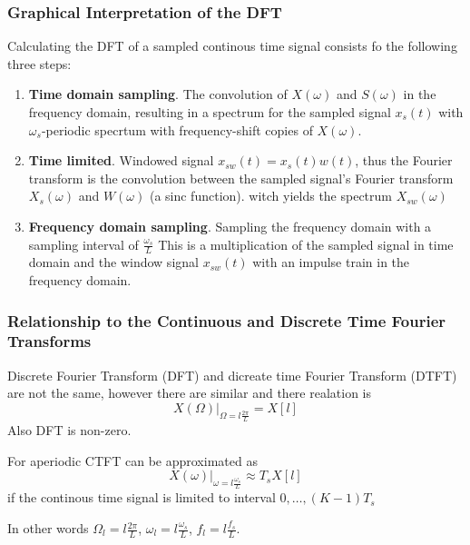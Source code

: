 \subsubsection{Graphical Interpretation of the DFT}
Calculating the DFT of a sampled continous time signal consists fo the following three steps:
\begin{enumerate}
    \item \textbf{Time domain sampling}. The convolution of $X(\omega)$ and $S(\omega)$
    in the frequency domain, resulting in a spectrum for the sampled signal $x_s(t)$ with 
    $\omega_s$-periodic specrtum with frequency-shift copies of $X(\omega)$. 
    \item \textbf{Time limited}. Windowed signal $x_{sw}(t)=x_s(t)w(t)$, thus the 
    Fourier transform is the convolution between the sampled signal's Fourier transform $X_s(\omega)$
    and $W(\omega)$ (a sinc function). witch yields the spectrum $X_{sw}(\omega)$
    \item \textbf{Frequency domain sampling}. Sampling the frequency domain with a sampling interval of $\frac{\omega_s}{L}$
    This is a multiplication of the sampled signal in time domain and the window signal $x_{sw}(t)$
    with an impulse train in the frequency domain.
\end{enumerate}


\subsubsection{Relationship to the Continuous and Discrete Time Fourier Transforms}
Discrete Fourier Transform (DFT) and dicreate time Fourier Transform (DTFT) are not the
same, however there are similar and there realation is
\begin{equation*}
    X(\Omega)|_{\Omega=l\frac{2\pi}{L}}=X[l]
\end{equation*}
Also DFT is non-zero.

For aperiodic CTFT can be approximated as 
\begin{equation*}
    X(\omega)|_{\omega=l\frac{\omega_s}{L}} \approx T_sX[l]
\end{equation*}
if the continous time signal is limited to interval $0,\ldots,(K-1)T_s$ \newline

In other words $\Omega_l=l\frac{2\pi}{L}$, $\omega_l=l\frac{\omega_s}{L}$,
$f_l=l\frac{f_s}{L}$.


